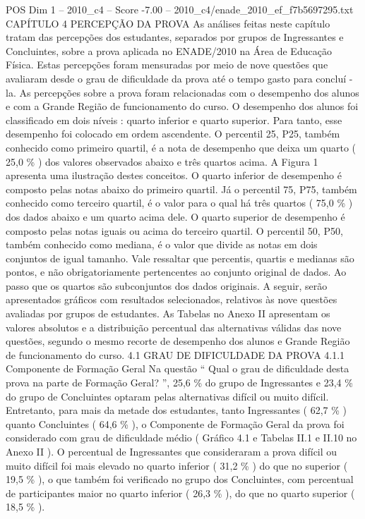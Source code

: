 \begin{textsample}{POS Dim 1 – 2010\_c4 – Score -7.00 – 2010\_c4/enade\_2010\_ef\_f7b5697295.txt}  \label{ex:f1_pos_409}
CAPÍTULO 4 PERCEPÇÃO DA PROVA As análises feitas neste capítulo tratam das percepções dos estudantes, separados por grupos de Ingressantes e Concluintes, sobre a prova aplicada no ENADE/2010 na Área de Educação Física.
Estas percepções foram mensuradas por meio de nove questões que avaliaram desde o grau de dificuldade da prova até o tempo gasto para concluí -la.
As percepções sobre a prova foram relacionadas com o desempenho dos alunos e com a Grande Região de funcionamento do curso.
O desempenho dos alunos foi classificado em dois níveis : quarto inferior e quarto superior.
Para tanto, esse desempenho foi colocado em ordem ascendente.
O percentil 25, P25, também conhecido como primeiro quartil, é a nota de desempenho que deixa um quarto ( 25,0 \% ) dos valores observados abaixo e três quartos acima.
A Figura 1 apresenta uma ilustração destes conceitos.
O quarto inferior de desempenho é composto pelas notas abaixo do primeiro quartil.
Já o percentil 75, P75, também conhecido como terceiro quartil, é o valor para o qual há três quartos ( 75,0 \% ) dos dados abaixo e um quarto acima dele.
O quarto superior de desempenho é composto pelas notas iguais ou acima do terceiro quartil.
O percentil 50, P50, também conhecido como mediana, é o valor que divide as notas em dois conjuntos de igual tamanho.
Vale ressaltar que percentis, quartis e medianas são pontos, e não obrigatoriamente pertencentes ao conjunto original de dados.
Ao passo que os quartos são subconjuntos dos dados originais.
A seguir, serão apresentados gráficos com resultados selecionados, relativos às nove questões avaliadas por grupos de estudantes.
As Tabelas no Anexo II apresentam os valores absolutos e a distribuição percentual das alternativas válidas das nove questões, segundo o mesmo recorte de desempenho dos alunos e Grande Região de funcionamento do curso. 4.1 GRAU DE DIFICULDADE DA PROVA 4.1.1 Componente de Formação Geral Na questão “ Qual o grau de dificuldade desta prova na parte de Formação Geral? ”, 25,6 \% do grupo de Ingressantes e 23,4 \% do grupo de Concluintes optaram pelas alternativas difícil ou muito difícil.
Entretanto, para mais da metade dos estudantes, tanto Ingressantes ( 62,7 \% ) quanto Concluintes ( 64,6 \% ), o Componente de Formação Geral da prova foi considerado com grau de dificuldade médio ( Gráfico 4.1 e Tabelas II.1 e II.10 no Anexo II ).
O percentual de Ingressantes que consideraram a prova difícil ou muito difícil foi mais elevado no quarto inferior ( 31,2 \% ) do que no superior ( 19,5 \% ), o que também foi verificado no grupo dos Concluintes, com percentual de participantes maior no quarto inferior ( 26,3 \% ), do que no quarto superior ( 18,5 \% ).

\end{textsample}
